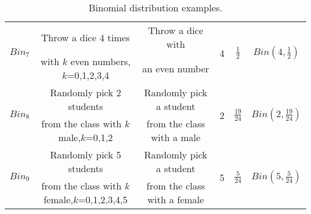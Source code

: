 \documentclass{article} %
\begin{document}
\begin{table}[h!]
\begin{center}
\begin{tabular}{|c|c|c|c|c|c|}
\multirow{2}{*}{$Bin_7$} & {Throw a dice 4 times} & {Throw a dice with} & \multirow{2}{*}{4} & \multirow{2}{*}{$\frac{1}{2}$} & \multirow{2}{*}{$Bin(4,\frac{1}{2})$} \\
&  with $k$ even numbers,$k$=0,1,2,3,4  & an even number & & & \\ \hline
\multirow{2}{*}{$Bin_8$} & {Randomly pick 2 students} & {Randomly pick a student}& \multirow{2}{*}{2} & \multirow{2}{*}{$\frac{19}{24}$} & \multirow{2}{*}{$Bin(2,\frac{19}{24})$} \\
&  from the class with $k$ male,$k$=0,1,2 &  from the class with a male  & & & \\ \hline
\multirow{2}{*}{$Bin_9$} & {Randomly pick 5 students}  & {Randomly pick a student}& \multirow{2}{*}{5} & \multirow{2}{*}{$\frac{5}{24}$} & \multirow{2}{*}{$Bin(5,\frac{5}{24})$} \\
& from the class with $k$ female,$k$=0,1,2,3,4,5 &  from the class with a female  & & & \\
\hline
\end{tabular}
\caption{Binomial distribution examples.}
\label{Ta:bin}
\end{center}
\end{table}
\end{document}
